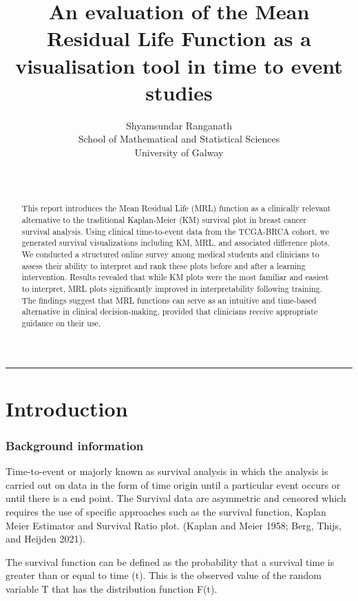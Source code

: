 \documentclass{article}
\title{An evaluation of the Mean Residual Life Function as a visualisation tool in time to event studies}
\author{
    Shyamsundar Ranganath
   \\
    School of Mathematical and Statistical Sciences \\
    University of Galway \\
   \\
  \texttt{} \\
  }
\begin{document}
\maketitle


\begin{abstract}
This report introduces the Mean Residual Life (MRL) function as a clinically relevant alternative to the traditional Kaplan-Meier (KM) survival plot in breast cancer survival analysis. Using clinical time-to-event data from the TCGA-BRCA cohort, we generated survival visualizations including KM, MRL, and associated difference plots. We conducted a structured online survey among medical students and clinicians to assess their ability to interpret and rank these plots before and after a learning intervention. Results revealed that while KM plots were the most familiar and easiest to interpret, MRL plots significantly improved in interpretability following training. The findings suggest that MRL functions can serve as an intuitive and time-based alternative in clinical decision-making, provided that clinicians receive appropriate guidance on their use.
\end{abstract}


\begin{center}\rule{0.5\linewidth}{0.5pt}\end{center}

\section{Introduction}\label{introduction}

\subsubsection{Background information}\label{background-information}

Time-to-event or majorly known as survival analysis in which the analysis is carried out on data in the form of time origin until a particular event occurs or until there is a end point. The Survival data are asymmetric and censored which requires the use of specific approaches such as the survival function, Kaplan Meier Estimator and Survival Ratio plot. (Kaplan and Meier 1958; Berg, Thijs, and Heijden 2021).

The survival function can be defined as the probability that a survival time is greater than or equal to time (t). This is the observed value of the random variable T that has the distribution function F(t).
\end{document}
